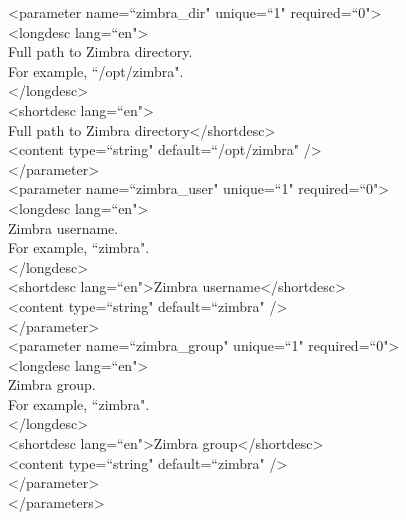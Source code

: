 \documentclass[a4paper, 12pt]{book}
\begin{document}
\noindent \textless parameter name=``zimbra\_dir" unique=``1" required=``0"\textgreater\\
\textless longdesc lang=``en"\textgreater\\
\indent Full path to Zimbra directory.\\
\indent For example, ``/opt/zimbra".\\
\textless /longdesc\textgreater\\
\textless shortdesc lang=``en"\textgreater\\
\indent Full path to Zimbra directory\textless /shortdesc\textgreater\\
\textless content type=``string" default=``/opt/zimbra" /\textgreater\\
\textless /parameter\textgreater\\

\noindent \textless parameter name=``zimbra\_user" unique=``1" required=``0"\textgreater\\
\textless longdesc lang=``en"\textgreater\\
\indent Zimbra username.\\
\indent For example, ``zimbra".\\
\textless /longdesc\textgreater\\
\textless shortdesc lang=``en"\textgreater Zimbra username\textless /shortdesc\textgreater\\
\textless content type=``string" default=``zimbra" /\textgreater\\
\textless /parameter\textgreater\\

\noindent \textless parameter name=``zimbra\_group" unique=``1" required=``0"\textgreater\\
\textless longdesc lang=``en"\textgreater\\
\indent Zimbra group.\\
\indent For example, ``zimbra".\\
\textless /longdesc\textgreater\\
\textless shortdesc lang=``en"\textgreater Zimbra group\textless /shortdesc\textgreater\\
\textless content type=``string" default=``zimbra" /\textgreater\\
\textless /parameter\textgreater\\

\noindent \textless /parameters\textgreater\\
\end{document}
